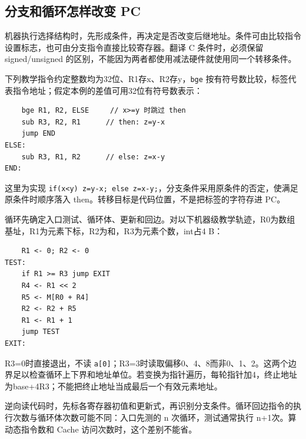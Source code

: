 \subsection{分支和循环怎样改变 PC}\label{co-04-06}

机器执行选择结构时，先形成条件，再决定是否改变后继地址。条件可由比较指令设置标志，也可由分支指令直接比较寄存器。翻译 C 条件时，必须保留 signed/unsigned 的区别，不能因为两者都使用减法硬件就使用同一个转移条件。

下列教学指令约定整数均为32位、R1存x、R2存y，\texttt{bge} 按有符号数比较，标签代表指令地址；假定本例的差值可用32位有符号数表示：

\par\medskip\noindent
\begin{minipage}{\linewidth}
\begin{verbatim}
    bge R1, R2, ELSE     // x>=y 时跳过 then
    sub R3, R2, R1      // then: z=y-x
    jump END
ELSE:
    sub R3, R1, R2      // else: z=x-y
END:
\end{verbatim}
\end{minipage}\par\medskip

这里为实现 \texttt{if(x\textless{}y)\ z=y-x;}\allowbreak{}\texttt{\ else\ z=x-y;}\allowbreak{}，分支条件采用原条件的否定，使满足原条件时顺序落入 then。转移目标是代码位置，不是把标签的字符存进 PC。

循环先确定入口测试、循环体、更新和回边。对以下机器级教学轨迹，R0为数组基址，R1为元素下标，R2为和，R3为元素个数，int占4 B：

\par\medskip\noindent
\begin{minipage}{\linewidth}
\begin{verbatim}
    R1 <- 0; R2 <- 0
TEST:
    if R1 >= R3 jump EXIT
    R4 <- R1 << 2
    R5 <- M[R0 + R4]
    R2 <- R2 + R5
    R1 <- R1 + 1
    jump TEST
EXIT:
\end{verbatim}
\end{minipage}\par\medskip

R3=0时直接退出，不读 \texttt{a{[}0{]}}；R3=3时读取偏移0、4、8而非0、1、2。这两个边界足以检查循环上下界和地址单位。若变换为指针遍历，每轮指针加4，终止地址为base+4R3；不能把终止地址当成最后一个有效元素地址。

逆向读代码时，先标各寄存器初值和更新式，再识别分支条件。循环回边指令的执行次数与循环体次数可能不同：入口先测的 n 次循环，测试通常执行 n+1次。算动态指令数和 Cache 访问次数时，这个差别不能省。

